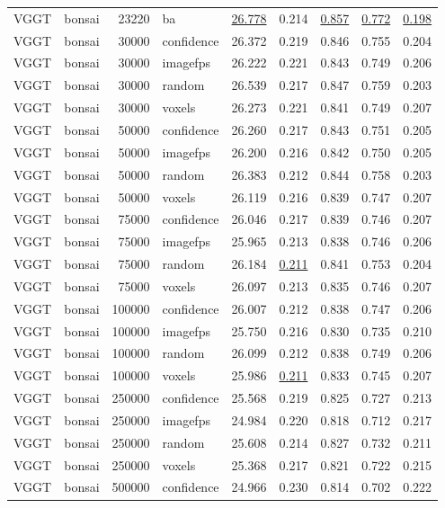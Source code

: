 \begin{table}[H]
\begin{tabular}{llrlrrrrr}
VGGT & bonsai & 23220 & ba & \underline{26.778} & 0.214 & \underline{0.857} & \underline{0.772} & \underline{0.198} \\
VGGT & bonsai & 30000 & confidence & 26.372 & 0.219 & 0.846 & 0.755 & 0.204 \\
VGGT & bonsai & 30000 & imagefps & 26.222 & 0.221 & 0.843 & 0.749 & 0.206 \\
VGGT & bonsai & 30000 & random & 26.539 & 0.217 & 0.847 & 0.759 & 0.203 \\
VGGT & bonsai & 30000 & voxels & 26.273 & 0.221 & 0.841 & 0.749 & 0.207 \\
VGGT & bonsai & 50000 & confidence & 26.260 & 0.217 & 0.843 & 0.751 & 0.205 \\
VGGT & bonsai & 50000 & imagefps & 26.200 & 0.216 & 0.842 & 0.750 & 0.205 \\
VGGT & bonsai & 50000 & random & 26.383 & 0.212 & 0.844 & 0.758 & 0.203 \\
VGGT & bonsai & 50000 & voxels & 26.119 & 0.216 & 0.839 & 0.747 & 0.207 \\
VGGT & bonsai & 75000 & confidence & 26.046 & 0.217 & 0.839 & 0.746 & 0.207 \\
VGGT & bonsai & 75000 & imagefps & 25.965 & 0.213 & 0.838 & 0.746 & 0.206 \\
VGGT & bonsai & 75000 & random & 26.184 & \underline{0.211} & 0.841 & 0.753 & 0.204 \\
VGGT & bonsai & 75000 & voxels & 26.097 & 0.213 & 0.835 & 0.746 & 0.207 \\
VGGT & bonsai & 100000 & confidence & 26.007 & 0.212 & 0.838 & 0.747 & 0.206 \\
VGGT & bonsai & 100000 & imagefps & 25.750 & 0.216 & 0.830 & 0.735 & 0.210 \\
VGGT & bonsai & 100000 & random & 26.099 & 0.212 & 0.838 & 0.749 & 0.206 \\
VGGT & bonsai & 100000 & voxels & 25.986 & \underline{0.211} & 0.833 & 0.745 & 0.207 \\
VGGT & bonsai & 250000 & confidence & 25.568 & 0.219 & 0.825 & 0.727 & 0.213 \\
VGGT & bonsai & 250000 & imagefps & 24.984 & 0.220 & 0.818 & 0.712 & 0.217 \\
VGGT & bonsai & 250000 & random & 25.608 & 0.214 & 0.827 & 0.732 & 0.211 \\
VGGT & bonsai & 250000 & voxels & 25.368 & 0.217 & 0.821 & 0.722 & 0.215 \\
VGGT & bonsai & 500000 & confidence & 24.966 & 0.230 & 0.814 & 0.702 & 0.222 \\

\end{tabular}
\end{table}

